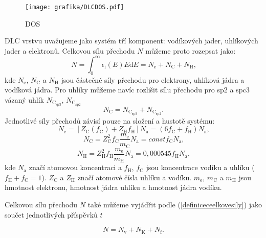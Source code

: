 \begin{figure}[h]
\centering
\texttt{[image: grafika/DLCDOS.pdf]}
\caption{DOS}
\label{DLCDOS}
\end{figure} 

DLC vrstvu uvažujeme jako systém tří komponent: vodíkových jader, uhlíkových jader a elektronů. Celkovou sílu přechodu $N$ můžeme proto rozepsat jako:
\begin{equation}
N = \int_0^\infty \epsilon_\mathrm{i}(E) E \mathrm{d}E = N_\mathrm{e} + N_\mathrm{C} + N_\mathrm{H} \text{,}
\end{equation} 
kde $N_\mathrm{e}$, $N_\mathrm{C}$ a $N_\mathrm{H}$ jsou částečné síly přechodu pro elektrony, uhlíková jádra a vodíková jádra. Pro uhlíky můžeme navíc rozlišit sílu přechodu pro sp2 a spc3 vázaný uhlík $N_\mathrm{C_{sp3}}$, $N_\mathrm{C_{sp2}}$
\begin{equation}
N_\mathrm{C} = N_\mathrm{C_{sp3}} + N_\mathrm{C_{sp2}} \text{.}
\end{equation} 
Jednotlivé síly přechodů závisí pouze na složení a hustotě systému:
\begin{equation}
N_\mathrm{e} = [Z_\mathrm{C}(f_\mathrm{C}) + Z_\mathrm{H} f_\mathrm{H}] N_\mathrm{a} = (6f_\mathrm{C} + f_\mathrm{H})N_\mathrm{a} \text{,}
\end{equation}
\begin{equation}
N_\mathrm{C} = Z^2_\mathrm{C} f_\mathrm{C} \frac{m_\mathrm{e}}{m_\mathrm{C}} N_\mathrm{a} = const f_\mathrm{C} N_\mathrm{a} \text{,}
\end{equation}
\begin{equation}
N_\mathrm{H} = Z^2_\mathrm{H} f_\mathrm{H} \frac{m_\mathrm{e}}{m_\mathrm{H}} N_\mathrm{a} = 0,000545 f_\mathrm{H} N_\mathrm{a} \text{,}
\end{equation}
kde $N_\mathrm{a}$ značí atomovou koncentraci a $f_\mathrm{H}$, $f_\mathrm{C}$ jsou koncentrace vodíku a uhlíku ($f_\mathrm{H} + f_\mathrm{C} = 1 $). $Z_\mathrm{C}$ a $Z_\mathrm{H}$ značí atomové čísla uhlíku a vodíku. $m_\mathrm{e}$, $m_\mathrm{C}$ a $m_\mathrm{H}$ jsou hmotnost elektronu, hmotnost jádra uhlíku a hmotnost jádra vodíku. 

Celkovou sílu přechodu $N$ také můžeme vyjádřit podle (\ref{definiceceelkovesily}) jako součet jednotlivých příspěvků $t$

\begin{equation}
N = N_\mathrm{v} + N_\mathrm{K} + N_\mathrm{f} \text{.}
\end{equation}

